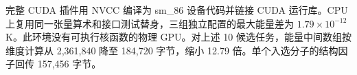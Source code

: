 完整 CUDA 插件用 NVCC 编译为 sm\_86 设备代码并链接 CUDA 运行库。CPU 上复用同一张量算术和接口测试替身，三组独立配置的最大能量差为 $1.79\times 10^{-12}$ K。此环境没有可执行核函数的物理 GPU。对上述 10 候选任务，能量中间数组按维度计算从 2,361,840 降至 184,720 字节，缩小 12.79 倍。单个入选分子的结构因子回传 157,456 字节。
